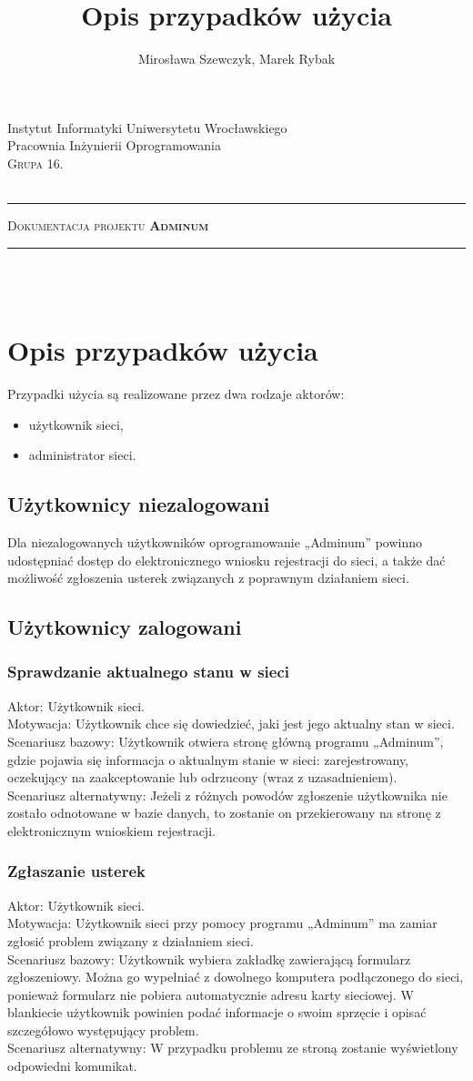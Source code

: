 \documentclass[12pt,a4paper,notitlepage]{article}
\author{Mirosława Szewczyk, Marek Rybak}
\title{Opis przypadków użycia}
\makeatletter
\newcommand{\linia}{\rule{\linewidth}{0.4mm}}
\renewcommand{\maketitle}{\begin{titlepage}
    \vspace*{2cm}
    \begin{center}\small        
        Instytut Informatyki Uniwersytetu Wrocławskiego\\
        Pracownia Inżynierii Oprogramowania\\
  \vspace{2cm}
	\normalsize \textsc{Grupa 16.}\\
        \normalsize \textsc{\@author}\\
\end{center}
    \vspace{3cm}
    \noindent\linia
    \begin{center}
        \LARGE \textsc{Dokumentacja projektu \textbf{Adminum}}\\       
        \linia
        \vspace{2cm}
        \LARGE \textsc{\@title}\\
      
        \vspace{1.5cm}
       \normalsize \@date\\




    \end{center}
  \end{titlepage}
}
\makeatother
\begin{document}
    \maketitle
\setcounter{page}{2}
    \tableofcontents
    \newpage
    \section{Opis przypadków użycia}
Przypadki użycia są realizowane przez dwa rodzaje aktorów:
	\begin{itemize}
	\item użytkownik sieci,
	\item administrator sieci.
	\end{itemize}
	\subsection{Użytkownicy niezalogowani}
Dla niezalogowanych użytkowników oprogramowanie „Adminum” powinno udostępniać dostęp do elektronicznego wniosku rejestracji do sieci, a także dać możliwość zgłoszenia usterek związanych z poprawnym działaniem sieci.
	\subsection{Użytkownicy zalogowani}
		\subsubsection{Sprawdzanie aktualnego stanu w sieci}

Aktor: Użytkownik sieci.\\
Motywacja: Użytkownik chce się dowiedzieć, jaki jest jego aktualny stan w sieci.\\
Scenariusz bazowy: Użytkownik otwiera stronę główną programu „Adminum”, gdzie pojawia się informacja o aktualnym stanie w sieci: zarejestrowany, oczekujący na zaakceptowanie lub odrzucony (wraz z uzasadnieniem).\\
Scenariusz alternatywny: Jeżeli z różnych powodów zgłoszenie użytkownika nie zostało odnotowane w bazie danych, to zostanie on przekierowany na stronę z elektronicznym wnioskiem rejestracji.
		\subsubsection{Zgłaszanie usterek}
Aktor: Użytkownik sieci.\\
Motywacja:  Użytkownik sieci przy pomocy programu „Adminum” ma zamiar zgłosić problem związany z działaniem sieci.\\
Scenariusz bazowy: Użytkownik wybiera zakładkę zawierającą formularz zgłoszeniowy. Można go wypełniać z dowolnego komputera podłączonego do sieci, ponieważ formularz nie pobiera automatycznie adresu karty sieciowej. W blankiecie użytkownik powinien podać informacje o swoim sprzęcie i opisać szczegółowo występujący problem.\\
Scenariusz alternatywny: W przypadku problemu ze stroną zostanie wyświetlony odpowiedni komunikat.
\end{document}
